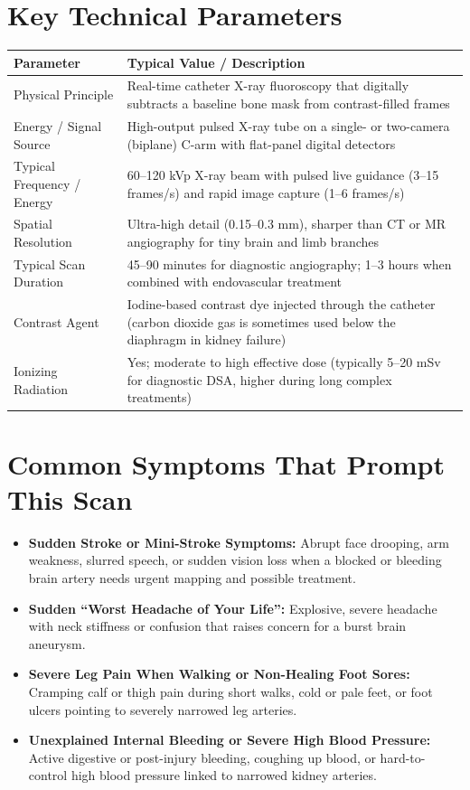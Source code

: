 \section{Key Technical Parameters}
\noindent
\begin{tabularx}{\textwidth}{@{}l X@{}}
\toprule
\textbf{Parameter} & \textbf{Typical Value / Description} \\
\midrule
Physical Principle & Real-time catheter X-ray fluoroscopy that digitally subtracts a baseline bone mask from contrast-filled frames \\
Energy / Signal Source & High-output pulsed X-ray tube on a single- or two-camera (biplane) C-arm with flat-panel digital detectors \\
Typical Frequency / Energy & 60--120 kVp X-ray beam with pulsed live guidance (3--15 frames/s) and rapid image capture (1--6 frames/s) \\
Spatial Resolution & Ultra-high detail (0.15--0.3 mm), sharper than CT or MR angiography for tiny brain and limb branches \\
Typical Scan Duration & 45--90 minutes for diagnostic angiography; 1--3 hours when combined with endovascular treatment \\
Contrast Agent & Iodine-based contrast dye injected through the catheter (carbon dioxide gas is sometimes used below the diaphragm in kidney failure) \\
Ionizing Radiation & Yes; moderate to high effective dose (typically 5--20 mSv for diagnostic DSA, higher during long complex treatments) \\
\bottomrule
\end{tabularx}

\section{Common Symptoms That Prompt This Scan}
\begin{itemize}
\item \textbf{Sudden Stroke or Mini-Stroke Symptoms:} Abrupt face drooping, arm weakness, slurred speech, or sudden vision loss when a blocked or bleeding brain artery needs urgent mapping and possible treatment.
\item \textbf{Sudden ``Worst Headache of Your Life'':} Explosive, severe headache with neck stiffness or confusion that raises concern for a burst brain aneurysm.
\item \textbf{Severe Leg Pain When Walking or Non-Healing Foot Sores:} Cramping calf or thigh pain during short walks, cold or pale feet, or foot ulcers pointing to severely narrowed leg arteries.
\item \textbf{Unexplained Internal Bleeding or Severe High Blood Pressure:} Active digestive or post-injury bleeding, coughing up blood, or hard-to-control high blood pressure linked to narrowed kidney arteries.
\end{itemize}

